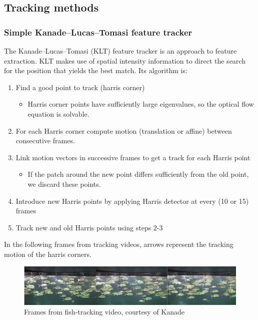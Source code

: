\documentclass{article}
\begin{document}
\subsection{Tracking methods}
\subsubsection{Simple Kanade–Lucas–Tomasi feature tracker}

The Kanade–Lucas–Tomasi (KLT) feature tracker is an approach to feature extraction. KLT makes use of spatial intensity information to direct the search for the position that yields the best match. Its algorithm is:

\begin{enumerate}
\item Find a good point to track (harris corner) 
\begin{itemize}
\item Harris corner points have sufficiently large eigenvalues, so the optical flow equation is solvable. 
\end{itemize}
\item For each Harris corner compute motion (translation or affine) between consecutive frames.
\item Link motion vectors in successive frames to get a track for each Harris point
\begin{itemize}
\item If the patch around the new point differs sufficiently from the old point, we discard these points.  
\end{itemize}
\item Introduce new Harris points by applying Harris detector at every (10 or 15) frames  
\item Track new and old Harris points using steps 2-3
\end{enumerate}

In the following frames from tracking videos, arrows represent the tracking motion of the harris corners. 

\begin{figure}[h]
  \centering
  \includegraphics[width=\linewidth]{fish.png}
  \caption{Frames from fish-tracking video, courtesy of Kanade}
\end{figure}
\end{document}
